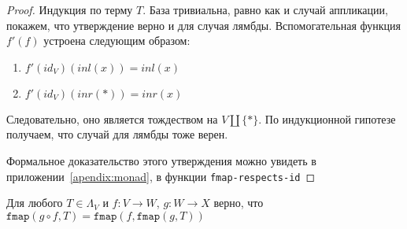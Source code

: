 \begin{proof}
  Индукция по терму $T$. База тривиальна, равно как и случай аппликации, покажем, что утверждение верно и для случая лямбды. Вспомогательная функция $f'(f)$ устроена следующим образом:
  \begin{enumerate}
    \item $f'(id_{V})(inl(x)) = inl(x)$
    \item $f'(id_{V})(inr(*)) = inr(x)$
  \end{enumerate}
  Следовательно, оно является тождеством на $V \coprod \{*\}$. По индукционной гипотезе получаем, что случай для лямбды тоже верен.

  Формальное доказательство этого утверждения можно увидеть в приложении~\ref{apendix:monad}, в функции \texttt{fmap-respects-id}
\end{proof}

\begin{prop}
  \label{monad:fmap-resp-comp}
  Для любого $T \in \Lambda_{V}$ и $f : V \to W$, $g : W \to X$ верно, что $\texttt{fmap}(g \circ f, T) = \texttt{fmap}(f, \texttt{fmap}(g, T))$
\end{prop}

